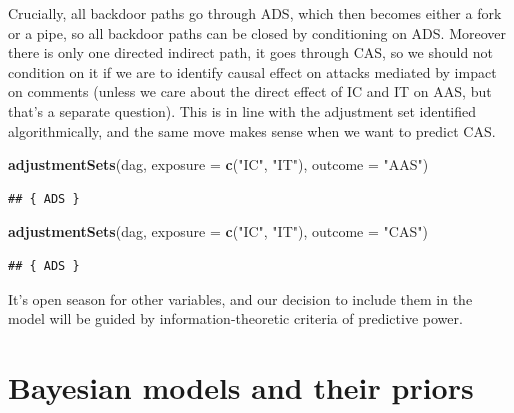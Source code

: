 \documentclass[10pt,dvipsnames,enabledeprecatedfontcommands]{scrartcl}
\newenvironment{Shaded}{\begin{snugshade}}{\end{snugshade}}
\newcommand{\KeywordTok}[1]{\textcolor[rgb]{0.13,0.29,0.53}{\textbf{#1}}}
\newcommand{\DataTypeTok}[1]{\textcolor[rgb]{0.13,0.29,0.53}{#1}}
\newcommand{\StringTok}[1]{\textcolor[rgb]{0.31,0.60,0.02}{#1}}
\newcommand{\NormalTok}[1]{#1}
\begin{document}
\normalsize

Crucially, all backdoor paths go through \textsf{ADS}, which then
becomes either a fork or a pipe, so all backdoor paths can be closed by
conditioning on \textsf{ADS}. Moreover there is only one directed
indirect path, it goes through \textsf{CAS}, so we should not condition
on it if we are to identify causal effect on attacks mediated by impact
on comments (unless we care about the direct effect of \textsf{IC} and
\textsf{IT} on \textsf{AAS}, but that's a separate question). This is in
line with the adjustment set identified algorithmically, and the same
move makes sense when we want to predict \textsf{CAS}.

\vspace{1mm} \footnotesize

\begin{Shaded}
\begin{Highlighting}[]
\KeywordTok{adjustmentSets}\NormalTok{(dag, }\DataTypeTok{exposure =} \KeywordTok{c}\NormalTok{(}\StringTok{"IC"}\NormalTok{, }\StringTok{"IT"}\NormalTok{), }\DataTypeTok{outcome =} \StringTok{"AAS"}\NormalTok{)}
\end{Highlighting}
\end{Shaded}

\begin{verbatim}
## { ADS }
\end{verbatim}

\begin{Shaded}
\begin{Highlighting}[]
\KeywordTok{adjustmentSets}\NormalTok{(dag, }\DataTypeTok{exposure =} \KeywordTok{c}\NormalTok{(}\StringTok{"IC"}\NormalTok{, }\StringTok{"IT"}\NormalTok{), }\DataTypeTok{outcome =} \StringTok{"CAS"}\NormalTok{)}
\end{Highlighting}
\end{Shaded}

\begin{verbatim}
## { ADS }
\end{verbatim}

\normalsize

It's open season for other variables, and our decision to include them
in the model will be guided by information-theoretic criteria of
predictive power.

\section{Bayesian models and their
priors}\label{bayesian-models-and-their-priors}
\end{document}
